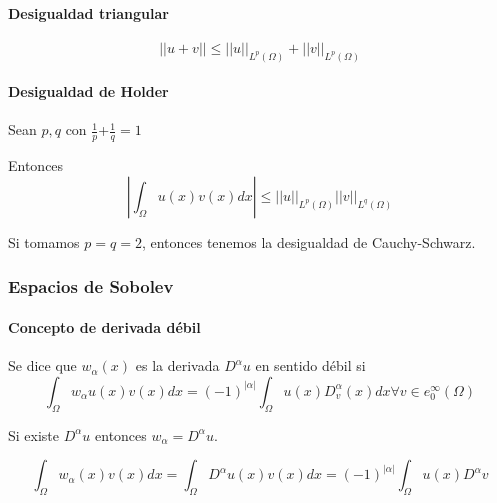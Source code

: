 \paragraph{Desigualdad triangular}
$$||u+v||\le ||u||_{L^p(\Omega)}+||v||_{L^p(\Omega)}$$

\paragraph{Desigualdad de Holder}
Sean $p,q$ con $\frac{1}{p}$+$\frac{1}{q} = 1$

Entonces
$$|\int_{\Omega}u(x)v(x)dx|\le||u||_{L^p(\Omega)}||v||_{L^q(\Omega)}$$

Si tomamos $p=q=2$, entonces tenemos la desigualdad de Cauchy-Schwarz.

\subsubsection{Espacios de Sobolev}
\paragraph{Concepto de derivada débil}
Se dice que $w_\alpha(x)$ es la derivada $D^\alpha u$ en sentido débil si
$$\int_{\Omega}w_\alpha u(x) v(x)dx = (-1)^{|\alpha|}\int_{\Omega}u(x)D_v^\alpha (x) dx 
\forall v\in e_0^\infty(\Omega)$$

Si existe $D^\alpha u$ entonces $w_\alpha = D^\alpha u$.

$$\int_\Omega w_\alpha (x)v(x) dx = \int_{\Omega}D^\alpha u(x) v(x)dx = (-1)^|\alpha|\int_{\Omega}u(x)D^\alpha v$$

